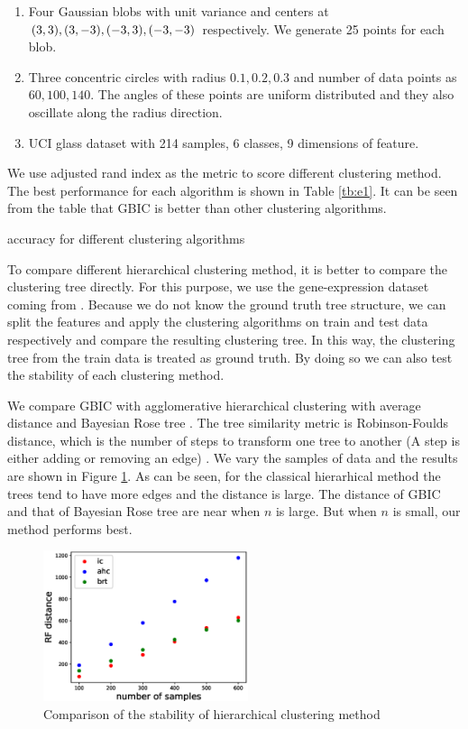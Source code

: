 \begin{enumerate}
\item Four Gaussian blobs with unit variance and centers at $(3,3), (3,-3), (-3,3),  \linebreak[4](-3,-3)$ respectively.  We generate 25 points for each blob.
\item Three concentric circles with radius $0.1,0.2,0.3$ and number of data points as $60, 100, 140$. The angles of these points are uniform distributed and they also oscillate along the radius direction.
\item UCI glass dataset with 214 samples, 6 classes, 9 dimensions of feature.
\end{enumerate}
We use adjusted rand index as the metric to score different clustering method.
The best performance for each algorithm is shown in Table \ref{tb:e1}.
It can be seen from the table that GBIC is better than other clustering algorithms.
\begin{table}[!ht]
\centering
{}
\caption{ accuracy for different clustering algorithms }\label{tb:e1}
\end{table}

To compare different hierarchical clustering method, it is better to compare the clustering tree directly.
For this purpose,
we use the gene-expression dataset coming from \cite{khan2001classification}.
Because we do not know the ground truth tree structure, we can split the features and apply the clustering algorithms on train and test data respectively and compare the resulting clustering tree. In this way, the clustering tree from the train data is treated as ground truth. By doing so we can also test the stability of each clustering method.

We compare GBIC with agglomerative hierarchical clustering with average distance and Bayesian Rose tree \citep{blundell2011discovering}. The tree similarity metric is Robinson-Foulds distance, which is the number of steps to transform one tree to another (A step is either adding or removing an edge) \citep{day1985optimal}. We vary the samples of data and the results are shown in Figure \ref{fig:shc}. As can be seen, for the classical hierarhical method the trees tend to have more edges and the distance is large. The distance of GBIC and that of Bayesian Rose tree are near when $n$ is large. But when $n$ is small, our method performs best.

\begin{figure}
\centering
\includegraphics[width=6cm]{pic/plot_results.eps}
\caption{Comparison of the stability of hierarchical clustering method}\label{fig:shc}
\end{figure}


